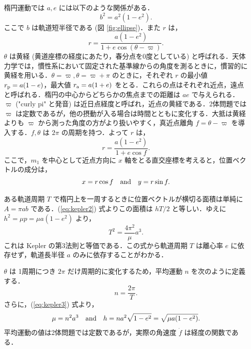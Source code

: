 \documentclass[11pt,a4paper,oneside,onecolumn]{jarticle}
\begin{document}
楕円運動では $a, e$ には以下のような関係がある．
\begin{equation}
b^2 = a^2 (1 - e^2).
\end{equation}
ここで $b$ は軌道短半径である (図 \ref{fig:ellipse})．また $r$ は，
\begin{equation}
r =\frac{a (1 - e^2)}{1+ e \cos (\theta - \varpi)}.
\end{equation}
$\theta$ は黄経 (黄道座標の経度にあたり，春分点を0度としている) と呼ばれる．天体力学では，慣性系において固定された基準線からの角度を測るときに，慣習的に黄経を用いる．$\theta = \varpi, \theta = \varpi + \pi$ のときに，それぞれ $r$ の最小値 $r_{\rm p} = a (1 - e)$，最大値 $r_{\rm a} = a (1 + e)$ をとる．これらの点はそれぞれ近点，遠点と呼ばれる．楕円の中心からどちらかの焦点までの距離は $a e$ で与えられる．$\varpi$ ("curly pi" と発音) は近日点経度と呼ばれ，近点の黄経である．2体問題では $\varpi$ は定数であるが，他の摂動が入る場合は時間とともに変化する．大抵は黄経よりも $\varpi$ から測った角度の方がより扱いやすく，真近点離角 $f = \theta - \varpi$ を導入する．$f, \theta$ は $2 \pi$ の周期を持つ．よって $r$ は，
\begin{equation}
r = \frac{a (1 - e^2)}{1+ e \cos f}. \label{eq:rf}
\end{equation}
ここで，$m_1$ を中心として近点方向に $x$ 軸をとる直交座標を考えると，位置ベクトルの成分は，
\begin{equation}
x = r \cos f \quad {\rm and} \quad y = r \sin f. \label{eq:xy}
\end{equation}

ある軌道周期 $T$ で楕円上を一周するときに位置ベクトルが横切る面積は単純に $A = \pi a b$ である．(\ref{eq:kepler2}) 式よりこの面積は $h T / 2$ と等しい．ゆえに $h^2 = \mu p = \mu a (1 - e^2)$ より，
\begin{equation}
T^2 = \frac{4 \pi^2}{\mu} a^3. \label{eq:kepler3}
\end{equation}
これは Kepler の第3法則と等価である．この式から軌道周期 $T$ は離心率 $e$ に依存せず，軌道長半径 $a$ のみに依存することがわかる．

$\theta$ は 1周期につき $2 \pi$ だけ周期的に変化するため，平均運動 $n$ を次のように定義する．
\begin{equation}
n = \frac{2 \pi}{T}. \label{eq:n}
\end{equation}
さらに，(\ref{eq:kepler3}) 式より，
\begin{equation}
\mu = n^2 a^3 \quad {\rm and} \quad h = n a^2 \sqrt{1 - e^2} = \sqrt{\mu a (1 - e^2)}. \label{eq:mu}
\end{equation}
平均運動の値は2体問題では定数であるが，実際の角速度 $\dot{f}$ は経度の関数である．
\end{document}
